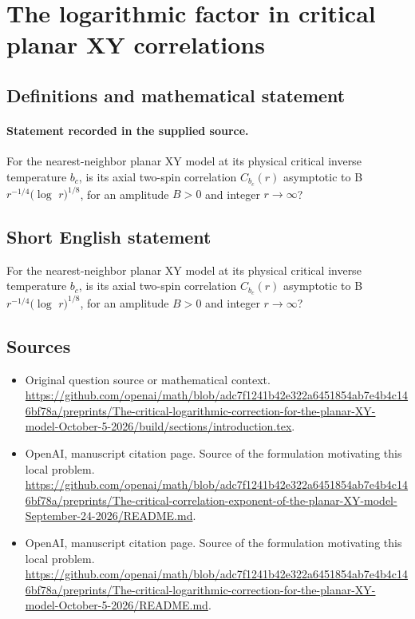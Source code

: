 \documentclass[11pt]{article}
\begin{document}
\section*{The logarithmic factor in critical planar XY correlations}\label{30007416}
\subsection{Definitions and mathematical statement}
\paragraph{Statement recorded in the supplied source.}
For the nearest-neighbor planar XY model at its physical critical inverse temperature $b_c$, is its axial two-spin correlation $C_{b_c}(r)$ asymptotic to B $r^{-1/4}(\log $ $r)^{1/8}$, for an amplitude $B>0$ and integer $r\to \infty $?
\subsection{Short English statement}
For the nearest-neighbor planar XY model at its physical critical inverse temperature $b_c$, is its axial two-spin correlation $C_{b_c}(r)$ asymptotic to B $r^{-1/4}(\log $ $r)^{1/8}$, for an amplitude $B>0$ and integer $r\to \infty $?
\subsection{Sources}
\begin{itemize}
\item[S1] Original question source or mathematical context.
\url{https://github.com/openai/math/blob/adc7f1241b42e322a6451854ab7e4b4c146bf78a/preprints/The-critical-logarithmic-correction-for-the-planar-XY-model-October-5-2026/build/sections/introduction.tex}.
\item[S2] OpenAI, manuscript citation page. Source of the formulation motivating this local problem.
\url{https://github.com/openai/math/blob/adc7f1241b42e322a6451854ab7e4b4c146bf78a/preprints/The-critical-correlation-exponent-of-the-planar-XY-model-September-24-2026/README.md}.
\item[S3] OpenAI, manuscript citation page. Source of the formulation motivating this local problem.
\url{https://github.com/openai/math/blob/adc7f1241b42e322a6451854ab7e4b4c146bf78a/preprints/The-critical-logarithmic-correction-for-the-planar-XY-model-October-5-2026/README.md}.
\end{itemize}
\end{document}
